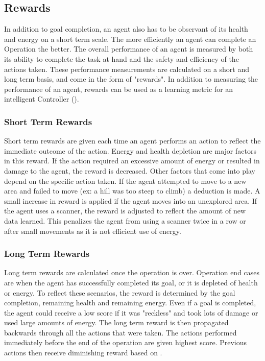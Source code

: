 \subsection{Rewards}
In addition to goal completion, an agent also has to be observant of its health and energy on a short term scale.
The more efficiently an agent can complete an Operation the better.
The overall performance of an agent is measured by both its ability to complete the task at hand and the safety and efficiency of the actions taken.
These performance measurements are calculated on a short and long term basis, and come in the form of "rewards".
In addition to measuring the performance of an agent, rewards can be used as a learning metric for an intelligent Controller ().

\subsubsection{Short Term Rewards}
Short term rewards are given each time an agent performs an action to reflect the immediate outcome of the action.
Energy and health depletion are major factors in this reward.
If the action required an excessive amount of energy or resulted in damage to the agent, the reward is decreased.
Other factors that come into play depend on the specific action taken.
If the agent attempted to move to a new area and failed to move (ex: a hill was too steep to climb) a deduction is made.
A small increase in reward is applied if the agent moves into an unexplored area.
If the agent uses a scanner, the reward is adjusted to reflect the amount of new data learned.
This penalizes the agent from using a scanner twice in a row or after small movements as it is not efficient use of energy.

\subsubsection{Long Term Rewards}
Long term rewards are calculated once the operation is over.
Operation end cases are when the agent has successfully completed its goal, or it is depleted of health or energy.
To reflect these scenarios, the reward is determined by the goal completion, remaining health and remaining energy.
Even if a goal is completed, the agent could receive a low score if it was "reckless" and took lots of damage or used large amounts of energy.
The long term reward is then propagated backwards through all the actions that were taken.
The actions performed immediately before the end of the operation are given highest score.
Previous actions then receive diminishing reward based on .



